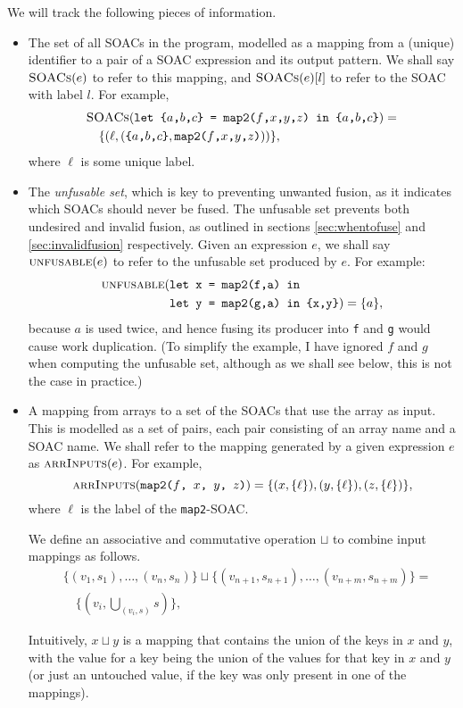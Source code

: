 We will track the following pieces of information.

\begin{itemize}
\item The set of all SOACs in the program, modelled as a mapping from
  a (unique) identifier to a pair of a SOAC expression and its output
  pattern.  We shall say $\textsc{SOACs}(e)$ to refer to this mapping, and
  $\textsc{SOACs}(e)[l]$ to refer to the SOAC with label $l$.  For example,
  \begin{align*}
  & \textsc{SOACs}(\texttt{let \{$a$,$b$,$c$\} = map2($f$,$x$,$y$,$z$) in \{$a$,$b$,$c$\}}) =\\
  & \quad \{ (\ell, (\texttt{\{$a$,$b$,$c$\}},\texttt{map2($f$,$x$,$y$,$z$)})) \},
  \end{align*}
  where $\ell$ is some unique label.

\item The \textit{unfusable set}, which is key to preventing unwanted
  fusion, as it indicates which SOACs should never be fused.  The
  unfusable set prevents both undesired and invalid fusion, as
  outlined in sections \ref{sec:whentofuse} and
  \ref{sec:invalidfusion} respectively.  Given an \LO{} expression
  $e$, we shall say $\textsc{unfusable}(e)$ to refer to the unfusable set
  produced by $e$.  For example:
  \begin{align*}
  \textsc{unfusable}(&\texttt{let x = map2(f,a) in}\\
  &\texttt{let y = map2(g,a) in \{x,y\}}) = \{a\},
  \end{align*}
  because $a$ is used twice, and hence fusing its producer into
  \texttt{f} and \texttt{g} would cause work duplication.  (To
  simplify the example, I have ignored $f$ and $g$ when computing the
  unfusable set, although as we shall see below, this is not the case
  in practice.)

\item A mapping from arrays to a set of the SOACs that use the array
  as input.  This is modelled as a set of pairs, each pair consisting
  of an array name and a SOAC name.  We shall refer to the mapping
  generated by a given expression $e$ as $\textsc{arrInputs}(e)$.  For example,
  \[
  \textsc{arrInputs}(\texttt{map2($f$, $x$, $y$, $z$)}) = \{ (x, \{\ell\}), (y, \{\ell\}), (z, \{\ell\}) \},
  \]
  where $\ell$ is the label of the \texttt{map2}-SOAC.

  We define an associative and commutative operation $\sqcup$ to
  combine input mappings as follows.
  \begin{align*}
  &\{(v_{1},s_{1}),\ldots,(v_{n},s_{n})\} \sqcup \{(v_{n+1},s_{n+1}),\ldots,(v_{n+m},s_{n+m})\} =\\
  &\quad \{(v_{i}, \bigcup_{(v_{i},s)} s)\},
  \end{align*}

  Intuitively, $x \sqcup y$ is a mapping that contains the union of
  the keys in $x$ and $y$, with the value for a key being the union of
  the values for that key in $x$ and $y$ (or just an untouched value,
  if the key was only present in one of the mappings).
\end{itemize}


